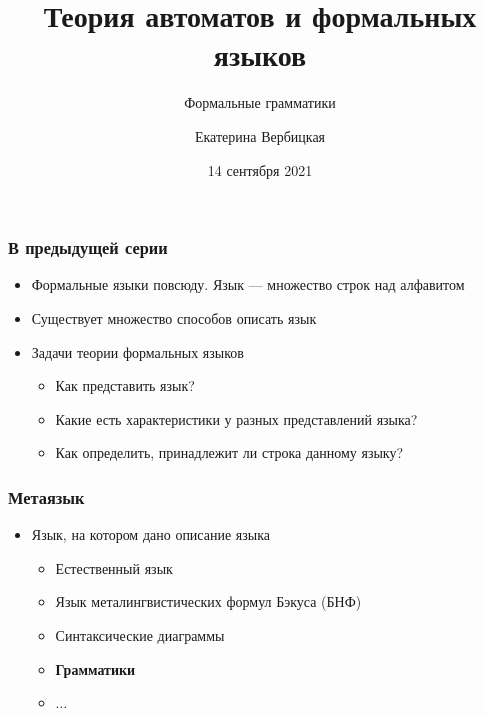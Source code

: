 \documentclass{beamer}
\title[]{Теория автоматов и формальных языков}
\subtitle[]{Формальные грамматики}
\institute[]{
Санкт-Петербургский государственный электротехнический университет <<ЛЭТИ>>\\
}
\author[]{Екатерина Вербицкая}
\date{14 сентября 2021}
\begin{document}
{
  \begin{frame}
    \titlepage
  \end{frame}
}

\begin{frame}[fragile]
  \transwipe[direction=90]
  \frametitle{В предыдущей серии}
  \begin{itemize}
    \item Формальные языки повсюду. Язык --- множество строк над алфавитом
    \item Существует множество способов описать язык
    \item Задачи теории формальных языков
    \begin{itemize}
      \item Как представить язык?
      \item Какие есть характеристики у разных представлений языка?
      \item Как определить, принадлежит ли строка данному языку?
    \end{itemize}
  \end{itemize}
\end{frame}

\begin{frame}[fragile]
  \transwipe[direction=90]
  \frametitle{Метаязык}
  \begin{itemize}
    \item Язык, на котором дано описание языка
    \begin{itemize}
      \item Естественный язык
      \item Язык металингвистических формул Бэкуса (БНФ)
      \item Синтаксические диаграммы
      \item \textbf{Грамматики}
      \item $\dots$
    \end{itemize}
  \end{itemize}
\end{frame}
\end{document}
